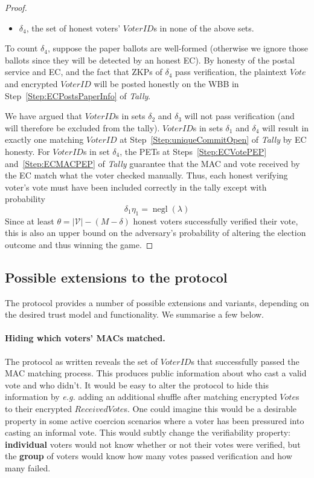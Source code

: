 \documentclass[12pt,a4paper]{article}
\DeclareMathOperator{\negl}{\text{negl}}
\theoremstyle{definition}
\newcommand{\Vote}{\mathit{Vote}}
\newcommand{\ReceivedVote}{\mathit{ReceivedVote}}
\newcommand{\VoterID}{\mathit{VoterID}}
\newcommand{\eg}{\textit{e.g. }}
\begin{document}
\begin{proof}
\begin{itemize}
        \item $\delta_4$, the set of honest voters' $\VoterID$s in none of the above sets.
    \end{itemize}

    To count $\delta_4$, suppose the paper ballots are well-formed (otherwise we ignore those ballots since they will be detected by an honest EC). By honesty of the postal service and EC, and the fact that ZKPs of $\delta_4$ pass verification, the plaintext $\Vote$ and encrypted $\VoterID$ will be posted honestly on the WBB in Step~\ref{Step:ECPostsPaperInfo} of \textit{Tally}.

    We have argued that $\VoterID$s in sets $\delta_2$ and $\delta_3$ will not pass verification (and will therefore be excluded from the tally). $\VoterID$s in sets $\delta_1$ and $\delta_4$ will result in exactly one matching $\VoterID$ at Step~\ref{Step:uniqueCommitOpen} of \textit{Tally} by EC honesty. For $\VoterID$s in set $\delta_4$, the PETs at Steps~\ref{Step:ECVotePEP} and~\ref{Step:ECMACPEP} of \textit{Tally} guarantee that the MAC and vote received by the EC match what the voter checked manually. Thus, each honest verifying voter's vote must have been included correctly in the tally except with probability
    $$\delta_1 \eta_1 = \negl(\lambda)$$
    Since at least $\theta=|\mathcal{V}|-(M-\delta)$ honest voters successfully verified their vote, this is also an upper bound on the adversary's probability of altering the election outcome and thus winning the game.
\end{proof}


\subsection{Possible extensions to the protocol}\label{sec-extensions}
The protocol provides a number of possible extensions and variants, depending on the desired trust model and functionality. We summarise a few below.
\paragraph{Hiding which voters' MACs matched.}
The protocol as written reveals the set of $\VoterID$s that successfully passed the MAC matching process. This produces public information about who cast a valid vote and who didn't. It would be easy to alter the protocol to hide this information by \eg adding an additional shuffle after matching encrypted $\Vote$s to their encrypted $\ReceivedVote$s. One could imagine this would be a desirable property in some active coercion scenarios where a voter has been pressured into casting an informal vote. This would subtly change the verifiability property: \textbf{individual} voters would not know whether or not their votes were verified, but the \textbf{group} of voters would know how many votes passed verification and how many failed.
\end{document}
